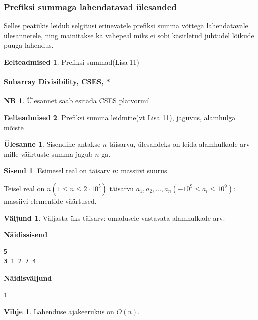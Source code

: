 \documentclass{trkut}
\theoremstyle{definition}
\newtheorem*{prereq}{Eelteadmised}
\newtheorem*{extra}{NB}
\newtheorem*{vihje}{Vihje}
\newtheorem*{Input}{Sisend}
\newtheorem*{Output}{Väljund}
\newtheorem*{Text}{Ülesanne}
\begin{document}
\subsubsection{Prefiksi summaga lahendatavad ülesanded}
Selles peatükis leidub selgitusi erinevatele prefiksi summa võttega lahendatavale ülesannetele, ning mainitakse ka vahepeal miks ei sobi käsitletud juhtudel lõikude puuga lahendus.
\begin{prereq}
Prefiksi summad(Lisa 11)
\end{prereq}
\paragraph{Subarray Divisibility, CSES, *}
\begin{extra}
Ülesannet saab esitada \href{https://cses.fi/problemset/task/1662}{CSES platvormil}.
\end{extra}
\begin{prereq}
Prefiksi summa leidmine(vt Lisa 11), jaguvus, alamhulga mõiste
\end{prereq}
\begin{Text}
Sisendine antakse $n$ täisarvu, ülesandeks on leida alamhulkade arv mille väärtuste summa jagub $n$-ga.

\parencite{div}
\end{Text}
\begin{Input}
Esimesel real on täisarv $n$: massiivi suurus.

Teisel real on $n$$(1\le n\le 2\cdot 10^5)$ täisarvu $a_1,a_2,...,a_n$$(-10^9\le a_i\le 10^9)$: massiivi elementide väärtused.
\end{Input}
\begin{Output}
Väljasta üks täisarv: omadusele vastavata alamhulkade arv.
\end{Output}

\textbf{Näidissisend}

\begin{verbatim}
5
3 1 2 7 4
\end{verbatim}

\textbf{Näidisväljund}

\begin{verbatim}
1
\end{verbatim}


\begin{vihje}
Lahenduse ajakeerukus on $O(n)$.
\end{vihje}
\end{document}
